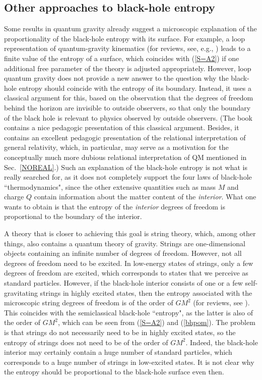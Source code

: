 \documentclass[12pt]{article}
\begin{document}
\subsection{Other approaches to black-hole entropy}

Some results in quantum gravity already suggest a microscopic explanation
of the proportionality of the black-hole entropy with its surface.
For example, a loop representation of quantum-gravity kinematics
(for reviews, see, e.g., \cite{rov,rovbook})
leads to a finite value of the entropy of a surface, which coincides 
with (\ref{S=A2}) if one additional 
free parameter of the theory is adjusted appropriately. However, loop quantum
gravity does not provide a new answer to the question why the black-hole 
entropy should coincide with the entropy of its boundary. Instead, it uses
a classical argument for this, based on the observation that 
the degrees of freedom behind the horizon are invisible to outside 
observers, so that only the boundary of the black hole is relevant 
to physics observed by outside observers. (The book \cite{rovbook}
contains a nice pedagogic presentation of this classical argument.
Besides, it contains an excellent pedagogic presentation 
of the relational interpretation of general relativity, which, in particular,
may serve as a motivation for the conceptually much more dubious 
relational interpretation of QM \cite{rov1,rov2} mentioned in 
Sec.~\ref{NOREAL}.) Such an explanation of the black-hole entropy 
is not what is really searched for, as it does not completely 
support the four laws of black-hole ``thermodynamics", since 
the other extensive quantities such as mass $M$ and charge $Q$
contain information about the matter content of the {\em interior}.
What one wants to obtain is that the entropy of the {\em interior}
degrees of freedom is proportional to the boundary of the interior.

A theory that is closer to achieving this goal is string theory,
which, among other things, also contains a quantum theory of gravity.
Strings are one-dimensional objects containing an infinite 
number of degrees of freedom. However, not all degrees 
of freedom need to be excited. In low-energy states 
of strings, only a few degrees of freedom are excited, which corresponds 
to states that we perceive as standard particles. 
However, if the black-hole interior consists of one or a few 
self-gravitating 
strings in highly excited states, then the entropy associated 
with the microscopic string degrees of freedom is 
of the order of $GM^2$ (for reviews, see \cite{zwie,horow}).
This coincides with the semiclassical black-hole 
``entropy", as the latter is also of the order of 
$GM^2$, which can be seen from (\ref{S=A2}) and (\ref{bhpom}). 
The problem is that strings do not necessarily need to be 
in highly excited states, so the entropy of strings 
does not need to be of the order of $GM^2$. Indeed, the black-hole
interior may certainly contain a huge 
number of standard particles, which corresponds to a huge 
number of strings in low-excited states. It is not clear 
why the entropy should be proportional 
to the black-hole surface even then.
\end{document}
